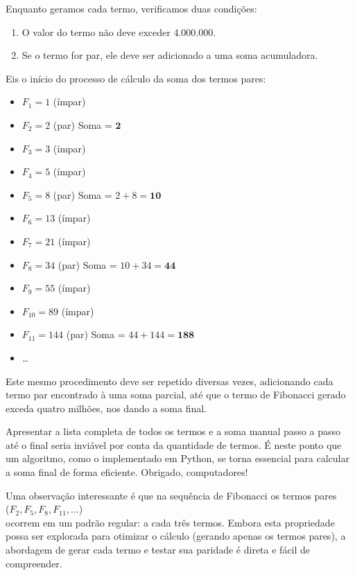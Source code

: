Enquanto geramos cada termo, verificamos duas condições:
\begin{enumerate}
    \item O valor do termo não deve exceder 4.000.000.
    \item Se o termo for par, ele deve ser adicionado a uma soma acumuladora.
\end{enumerate}

Eis o início do processo de cálculo da soma dos termos pares:
\begin{itemize}
    \item $F_1 = 1$ (ímpar)
    \item $F_2 = 2$ (par) Soma = $\mathbf{2}$
    \item $F_3 = 3$ (ímpar)
    \item $F_4 = 5$ (ímpar)
    \item $F_5 = 8$ (par) Soma = $2 + 8 = \mathbf{10}$
    \item $F_6 = 13$ (ímpar)
    \item $F_7 = 21$ (ímpar)
    \item $F_8 = 34$ (par) Soma = $10 + 34 = \mathbf{44}$
    \item $F_9 = 55$ (ímpar)
    \item $F_{10} = 89$ (ímpar)
    \item $F_{11} = 144$ (par) Soma = $44 + 144 = \mathbf{188}$
    \item \dots
\end{itemize}

Este mesmo procedimento deve ser repetido diversas vezes, adicionando cada termo par encontrado à uma soma parcial, até que o termo de Fibonacci gerado exceda quatro milhões, nos dando a soma final.

Apresentar a lista completa de todos os termos e a soma manual passo a passo até o final seria inviável por conta da quantidade de termos. É neste ponto que um algoritmo, como o implementado em Python, se torna essencial para calcular a soma final de forma eficiente. Obrigado, computadores!

Uma observação interessante é que na sequência de Fibonacci os termos pares \\($F_2, F_5, F_8, F_{11}, \dots$)\\ ocorrem em um padrão regular: a cada três termos. Embora esta propriedade possa ser explorada para otimizar o cálculo (gerando apenas os termos pares), a abordagem de gerar cada termo e testar sua paridade é direta e fácil de compreender.

